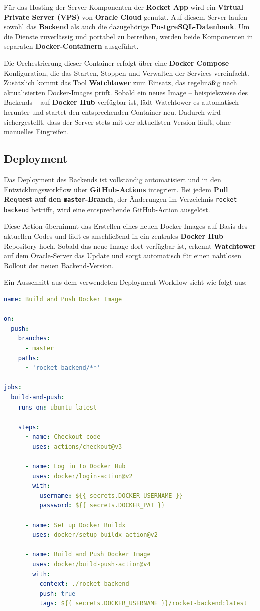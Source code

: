 \documentclass[11pt,a4paper]{article}
\begin{document}
Für das Hosting der Server-Komponenten der \textbf{Rocket App} wird ein \textbf{Virtual Private Server (VPS)} von \textbf{Oracle Cloud} genutzt. Auf diesem Server laufen sowohl das \textbf{Backend} als auch die dazugehörige \textbf{PostgreSQL-Datenbank}\cite{postgresql}. Um die Dienste zuverlässig und portabel zu betreiben, werden beide Komponenten in separaten \textbf{Docker-Containern}\cite{docker} ausgeführt.

Die Orchestrierung dieser Container erfolgt über eine \textbf{Docker Compose}-Konfiguration, die das Starten, Stoppen und Verwalten der Services vereinfacht. Zusätzlich kommt das Tool \textbf{Watchtower} zum Einsatz, das regelmäßig nach aktualisierten Docker-Images prüft. Sobald ein neues Image – beispielsweise des Backends – auf \textbf{Docker Hub} verfügbar ist, lädt Watchtower es automatisch herunter und startet den entsprechenden Container neu. Dadurch wird sichergestellt, dass der Server stets mit der aktuellsten Version läuft, ohne manuelles Eingreifen.

\subsection{Deployment}

Das Deployment des Backends ist vollständig automatisiert und in den Entwicklungsworkflow über \textbf{GitHub-Actions}\cite{github} integriert. Bei jedem \textbf{Pull Request auf den \texttt{master}-Branch}, der Änderungen im Verzeichnis \texttt{rocket-backend} betrifft, wird eine entsprechende GitHub-Action ausgelöst.

Diese Action übernimmt das Erstellen eines neuen Docker-Images auf Basis des aktuellen Codes und lädt es anschließend in ein zentrales \textbf{Docker Hub}-Repository hoch. Sobald das neue Image dort verfügbar ist, erkennt \textbf{Watchtower} auf dem Oracle-Server das Update und sorgt automatisch für einen nahtlosen Rollout der neuen Backend-Version.

Ein Ausschnitt aus dem verwendeten Deployment-Workflow sieht wie folgt aus:

\begin{lstlisting}[language=yaml, caption={GitHub Action zur automatisierten Bereitstellung}, label={lst:deployment}]
name: Build and Push Docker Image

on:
  push:
    branches:
      - master
    paths:
      - 'rocket-backend/**'

jobs:
  build-and-push:
    runs-on: ubuntu-latest

    steps:
      - name: Checkout code
        uses: actions/checkout@v3

      - name: Log in to Docker Hub
        uses: docker/login-action@v2
        with:
          username: ${{ secrets.DOCKER_USERNAME }}
          password: ${{ secrets.DOCKER_PAT }}

      - name: Set up Docker Buildx
        uses: docker/setup-buildx-action@v2

      - name: Build and Push Docker Image
        uses: docker/build-push-action@v4
        with:
          context: ./rocket-backend
          push: true
          tags: ${{ secrets.DOCKER_USERNAME }}/rocket-backend:latest
\end{lstlisting}
\end{document}
